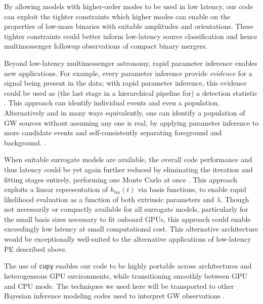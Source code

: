 \documentclass[twocolumn,prd,nofootinbib]{revtex4}
\newcommand\editremark[1]{{\color{red} #1}}
\begin{document}
By allowing  models with higher-order modes to be used in low latency, our code can exploit the tighter constraints which higher modes can enable on  the properties of low-mass
binaries with suitable amplitudes and orientations.  These tighter constraints could
better  inform low-latency source classification and hence multimessenger followup observations of compact binary mergers.

Beyond low-latency multimessenger astronomy, rapid parameter inference enables new applications.  For example, every
parameter inference provide \emph{evidence} for a signal being present in the data; with rapid parameter inference, this
evidence could be used as (the last stage in a hierarchical pipeline for) a detection statistic
\cite{2018PhRvX...8b1019S}.    
This approach can identify individual events and
even a population.
Alternatively and in many ways equivalently, one can identify a population of GW sources without assuming any one is
real, by  applying parameter inference to more candidate events and self-consistently separating foreground and
background. 
\cite{2015PhRvD..91b3005F,2019MNRAS.tmp..230G}.


When suitable surrogate models are available, the overall code performance and thus latency could be yet again further
reduced by eliminating the iteration and fitting stages entirely, performing one Monte Carlo at once
\cite{gwastro-PE-AlternativeArchitecturesROM}.  This approach exploits a linear representation of  $h_{lm}(t)$  via
basis functions, to enable rapid likelihood evaluation as a function of both extrinsic parameters and  $\lambda$.
Though not necessarily or compactly available for all surrogate models, particularly for the small basis sizes necessary
to fit onboard GPUs, this approach could enable exceedingly low latency at small computational cost.  This alternative
architecture would be exceptionally well-suited to the alternative applications of low-latency PE described above. 


The use of \texttt{cupy} enables our code to be highly portable across architectures and heterogeneous GPU environments,
while transitioning smoothly between GPU and CPU mode.     The techniques we used here will be transported to other
Bayesian inference modeling codes used to interpret GW observations \cite{gwastro-PopulationReconstruct-Parametric-Wysocki2018,gwastro-PopulationReconstruct-Code-PopModels}.
\end{document}
